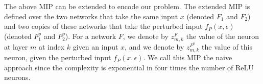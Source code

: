 The above MIP can be extended to encode our problem. %
The extended MIP is defined over 
the two networks that take the same input $x$ (denoted $F_1$ and $F_2$) and 
two copies of these networks that take the perturbed input 
$f_P(x,\epsilon)$ (denoted $F^p_1$ and $F^p_2$). For a network $F$, we denote by $z^F_{m,k}$ the value of the neuron at layer $m$ at index $k$ given an input $x$, and we denote by $z^{F^p}_{m,k}$ the value of this neuron, given the perturbed input $f_P(x,\epsilon)$.
We call this MIP the naive approach since the complexity is exponential in four times the number of ReLU neurons.

